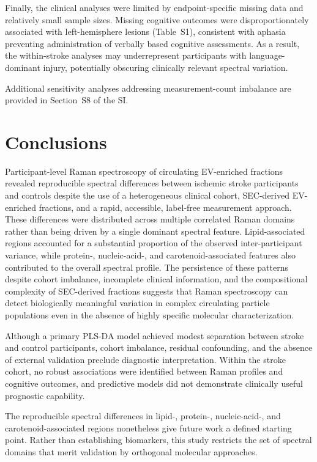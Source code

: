 \documentclass[preprint,12pt]{elsarticle}
\begin{document}
Finally, the clinical analyses were limited by endpoint-specific missing data and relatively small sample sizes. Missing cognitive outcomes were disproportionately associated with left-hemisphere lesions (Table~S1), consistent with aphasia preventing administration of verbally based cognitive assessments. As a result, the within-stroke analyses may underrepresent participants with language-dominant injury, potentially obscuring clinically relevant spectral variation.

Additional sensitivity analyses addressing measurement-count imbalance are provided in Section~S8 of the SI.


\section{Conclusions} 
\label{sec:conclusions}

Participant-level Raman spectroscopy of circulating EV-enriched fractions revealed reproducible spectral differences between ischemic stroke participants and controls despite the use of a heterogeneous clinical cohort, SEC-derived EV-enriched fractions, and a rapid, accessible, label-free measurement approach. These differences were distributed across multiple correlated Raman domains rather than being driven by a single dominant spectral feature. Lipid-associated regions accounted for a substantial proportion of the observed inter-participant variance, while protein-, nucleic-acid-, and carotenoid-associated features also contributed to the overall spectral profile. The persistence of these patterns despite cohort imbalance, incomplete clinical information, and the compositional complexity of SEC-derived fractions suggests that Raman spectroscopy can detect biologically meaningful variation in complex circulating particle populations even in the absence of highly specific molecular characterization.

Although a primary PLS-DA model achieved modest separation between stroke and control participants, cohort imbalance, residual confounding, and the absence of external validation preclude diagnostic interpretation. Within the stroke cohort, no robust associations were identified between Raman profiles and cognitive outcomes, and predictive models did not demonstrate clinically useful prognostic capability.

The reproducible spectral differences in lipid-, protein-, nucleic-acid-, and carotenoid-associated regions nonetheless give future work a defined starting point. Rather than establishing biomarkers, this study restricts the set of spectral domains that merit validation by orthogonal molecular approaches.
\end{document}
